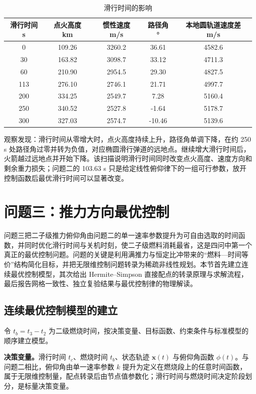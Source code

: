 \documentclass[withoutpreface,bwprint]{cumcmthesis}
\begin{document}
\begin{table}[!htbp]
\caption{滑行时间的影响}
\label{tab:tcsweep}
\centering
\begin{tabular}{c|c|c|c|c}
\toprule[1.5pt]
滑行时间 s & 点火高度 km & 惯性速度 m/s & 路径角 ° & 本地圆轨道速度差 m/s \\
\midrule[1pt]
0 & 109.26 & 3260.2 & 36.61 & 4582.6 \\
30 & 163.82 & 3098.7 & 33.12 & 4711.3 \\
60 & 210.90 & 2954.5 & 29.30 & 4827.5 \\
113 & 276.10 & 2746.1 & 21.71 & 4997.7 \\
200 & 334.25 & 2549.7 & 7.28 & 5160.4 \\
250 & 340.52 & 2527.8 & -1.64 & 5178.7 \\
300 & 327.03 & 2574.7 & -10.46 & 5139.6 \\
\bottomrule[1.5pt]
\end{tabular}
\end{table}

观察发现：滑行时间从零增大时，点火高度持续上升，路径角单调下降，在约 250 s 处路径角过零并转为负值，对应椭圆滑行弹道的远地点。继续增大滑行时间后，火箭越过远地点并开始下降。该扫描说明滑行时间同时改变点火高度、速度方向和剩余重力损失；问题二的 103.63 s 只是给定线性俯仰律下的一组可行参数，放开控制函数后最优滑行时间可以显著改变。

\section{问题三：推力方向最优控制}

问题三把二子级推力俯仰角由问题二的单一速率参数提升为可自由选取的时间函数，并同时优化滑行时间与关机时刻，使二子级燃料消耗最省，这是四问中第一个真正的最优控制问题。问题的关键是利用满推力与恒定比冲带来的“燃料—时间等价”结构简化目标，并把无限维控制问题转录为稀疏非线性规划。本节首先建立连续最优控制模型，其次给出 Hermite--Simpson 直接配点的转录原理与求解流程，最后报告网格一致性、独立复验结果与最优控制律的物理解读。

\subsection{连续最优控制模型的建立}
令 $t_b=t_3-t_2$ 为二级燃烧时间，按决策变量、目标函数、约束条件与标准模型的顺序建立模型。

\textbf{决策变量。}滑行时间 $t_c$、燃烧时间 $t_b$、状态轨迹 $\bm x(t)$ 与俯仰角函数 $\phi(t)$。与问题二相比，俯仰角由单一速率参数 $k$ 提升为定义在燃烧段上的任意时间函数，属于无限维控制量，配点转录后由节点值参数化；滑行时间与燃烧时间决定阶段划分，是标量决策变量。
\end{document}

